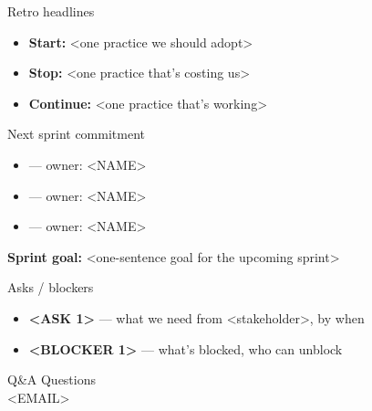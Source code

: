 \documentclass[aspectratio=169,12pt]{beamer}
\begin{document}
\begin{frame}{Retro headlines}
  \begin{itemize}
    \item \textbf{Start:} <one practice we should adopt>
    \item \textbf{Stop:} <one practice that's costing us>
    \item \textbf{Continue:} <one practice that's working>
  \end{itemize}
\end{frame}

\begin{frame}{Next sprint commitment}
  \begin{itemize}
    \item <ITEM 1> --- owner: <NAME>
    \item <ITEM 2> --- owner: <NAME>
    \item <ITEM 3> --- owner: <NAME>
  \end{itemize}
  \vspace{0.5em}
  \textbf{Sprint goal:} <one-sentence goal for the upcoming sprint>
\end{frame}

\begin{frame}{Asks / blockers}
  \begin{itemize}
    \item \textbf{<ASK 1>} --- what we need from <stakeholder>, by when
    \item \textbf{<BLOCKER 1>} --- what's blocked, who can unblock
  \end{itemize}
\end{frame}

\begin{frame}[plain]{Q\&A}
  \vfill
  \centering
  \Large Questions\\[1em]
  \normalsize <EMAIL>
  \vfill
\end{frame}
\end{document}
